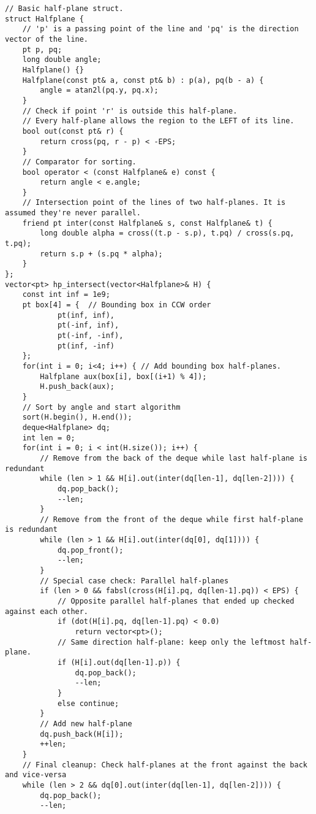 \documentclass[twoside]{article}
\begin{document}
\begin{multicols*}{2}
\begin{verbatim}
// Basic half-plane struct.
struct Halfplane {
    // 'p' is a passing point of the line and 'pq' is the direction vector of the line.
    pt p, pq;
    long double angle;
    Halfplane() {}
    Halfplane(const pt& a, const pt& b) : p(a), pq(b - a) {
        angle = atan2l(pq.y, pq.x);
    }
    // Check if point 'r' is outside this half-plane.
    // Every half-plane allows the region to the LEFT of its line.
    bool out(const pt& r) {
        return cross(pq, r - p) < -EPS;
    }
    // Comparator for sorting.
    bool operator < (const Halfplane& e) const {
        return angle < e.angle;
    }
    // Intersection point of the lines of two half-planes. It is assumed they're never parallel.
    friend pt inter(const Halfplane& s, const Halfplane& t) {
        long double alpha = cross((t.p - s.p), t.pq) / cross(s.pq, t.pq);
        return s.p + (s.pq * alpha);
    }
};
vector<pt> hp_intersect(vector<Halfplane>& H) {
    const int inf = 1e9;
    pt box[4] = {  // Bounding box in CCW order
            pt(inf, inf),
            pt(-inf, inf),
            pt(-inf, -inf),
            pt(inf, -inf)
    };
    for(int i = 0; i<4; i++) { // Add bounding box half-planes.
        Halfplane aux(box[i], box[(i+1) % 4]);
        H.push_back(aux);
    }
    // Sort by angle and start algorithm
    sort(H.begin(), H.end());
    deque<Halfplane> dq;
    int len = 0;
    for(int i = 0; i < int(H.size()); i++) {
        // Remove from the back of the deque while last half-plane is redundant
        while (len > 1 && H[i].out(inter(dq[len-1], dq[len-2]))) {
            dq.pop_back();
            --len;
        }
        // Remove from the front of the deque while first half-plane is redundant
        while (len > 1 && H[i].out(inter(dq[0], dq[1]))) {
            dq.pop_front();
            --len;
        }
        // Special case check: Parallel half-planes
        if (len > 0 && fabsl(cross(H[i].pq, dq[len-1].pq)) < EPS) {
            // Opposite parallel half-planes that ended up checked against each other.
            if (dot(H[i].pq, dq[len-1].pq) < 0.0)
                return vector<pt>();
            // Same direction half-plane: keep only the leftmost half-plane.
            if (H[i].out(dq[len-1].p)) {
                dq.pop_back();
                --len;
            }
            else continue;
        }
        // Add new half-plane
        dq.push_back(H[i]);
        ++len;
    }
    // Final cleanup: Check half-planes at the front against the back and vice-versa
    while (len > 2 && dq[0].out(inter(dq[len-1], dq[len-2]))) {
        dq.pop_back();
        --len;

\end{verbatim}
\end{multicols*}
\end{document}
